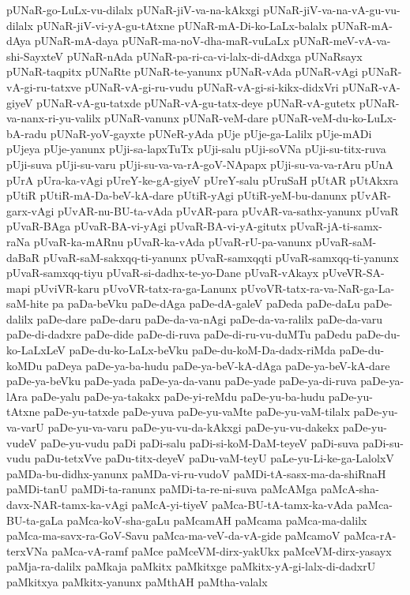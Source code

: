 {pUNaR-go-LuLx-vu-dilalx
pUNaR-jiV-va-na-kAkxgi
pUNaR-jiV-va-na-vA-gu-vu-dilalx
pUNaR-jiV-vi-yA-gu-tAtxne
pUNaR-mA-Di-ko-LaLx-balalx
pUNaR-mA-dAya
pUNaR-mA-daya
pUNaR-ma-noV-dha-maR-vuLaLx
pUNaR-meV-vA-va-shi-SayxteV
pUNaR-nAda
pUNaR-pa-ri-ca-vi-lalx-di-dAdxga
pUNaRsayx
pUNaR-taqpitx
pUNaRte
pUNaR-te-yanunx
pUNaR-vAda
pUNaR-vAgi
pUNaR-vA-gi-ru-tatxve
pUNaR-vA-gi-ru-vudu
pUNaR-vA-gi-si-kikx-didxVri
pUNaR-vA-giyeV
pUNaR-vA-gu-tatxde
pUNaR-vA-gu-tatx-deye
pUNaR-vA-gutetx
pUNaR-va-nanx-ri-yu-valilx
pUNaR-vanunx
pUNaR-veM-dare
pUNaR-veM-du-ko-LuLx-bA-radu
pUNaR-yoV-gayxte
pUNeR-yAda
pUje
pUje-ga-Lalilx
pUje-mADi
pUjeya
pUje-yanunx
pUji-sa-lapxTuTx
pUji-salu
pUji-soVNa
pUji-su-titx-ruva
pUji-suva
pUji-su-varu
pUji-su-va-va-rA-goV-NApapx
pUji-su-va-va-rAru
pUnA
pUrA
pUra-ka-vAgi
pUreY-ke-gA-giyeV
pUreY-salu
pUruSaH
pUtAR
pUtAkxra
pUtiR
pUtiR-mA-Da-beV-kA-dare
pUtiR-yAgi
pUtiR-yeM-bu-danunx
pUvAR-garx-vAgi
pUvAR-nu-BU-ta-vAda
pUvAR-para
pUvAR-va-sathx-yanunx
pUvaR
pUvaR-BAga
pUvaR-BA-vi-yAgi
pUvaR-BA-vi-yA-gitutx
pUvaR-jA-ti-samx-raNa
pUvaR-ka-mARnu
pUvaR-ka-vAda
pUvaR-rU-pa-vanunx
pUvaR-saM-daBaR
pUvaR-saM-sakxqq-ti-yanunx
pUvaR-samxqqti
pUvaR-samxqq-ti-yanunx
pUvaR-samxqq-tiyu
pUvaR-si-dadhx-te-yo-Dane
pUvaR-vAkayx
pUveVR-SA-mapi
pUviVR-karu
pUvoVR-tatx-ra-ga-Lanunx
pUvoVR-tatx-ra-va-NaR-ga-La-saM-hite
pa
paDa-beVku
paDe-dAga
paDe-dA-galeV
paDeda
paDe-daLu
paDe-dalilx
paDe-dare
paDe-daru
paDe-da-va-nAgi
paDe-da-va-ralilx
paDe-da-varu
paDe-di-dadxre
paDe-dide
paDe-di-ruva
paDe-di-ru-vu-duMTu
paDedu
paDe-du-ko-LaLxLeV
paDe-du-ko-LaLx-beVku
paDe-du-koM-Da-dadx-riMda
paDe-du-koMDu
paDeya
paDe-ya-ba-hudu
paDe-ya-beV-kA-dAga
paDe-ya-beV-kA-dare
paDe-ya-beVku
paDe-yada
paDe-ya-da-vanu
paDe-yade
paDe-ya-di-ruva
paDe-ya-lAra
paDe-yalu
paDe-ya-takakx
paDe-yi-reMdu
paDe-yu-ba-hudu
paDe-yu-tAtxne
paDe-yu-tatxde
paDe-yuva
paDe-yu-vaMte
paDe-yu-vaM-tilalx
paDe-yu-va-varU
paDe-yu-va-varu
paDe-yu-vu-da-kAkxgi
paDe-yu-vu-dakekx
paDe-yu-vudeV
paDe-yu-vudu
paDi
paDi-salu
paDi-si-koM-DaM-teyeV
paDi-suva
paDi-su-vudu
paDu-tetxVve
paDu-titx-deyeV
paDu-vaM-teyU
paLe-yu-Li-ke-ga-LalolxV
paMDa-bu-didhx-yanunx
paMDa-vi-ru-vudoV
paMDi-tA-sasx-ma-da-shiRnaH
paMDi-tanU
paMDi-ta-ranunx
paMDi-ta-re-ni-suva
paMcAMga
paMcA-sha-davx-NAR-tamx-ka-vAgi
paMcA-yi-tiyeV
paMca-BU-tA-tamx-ka-vAda
paMca-BU-ta-gaLa
paMca-koV-sha-gaLu
paMcamAH
paMcama
paMca-ma-dalilx
paMca-ma-savx-ra-GoV-Savu
paMca-ma-veV-da-vA-gide
paMcamoV
paMca-rA-terxVNa
paMca-vA-ramf
paMce
paMceVM-dirx-yakUkx
paMceVM-dirx-yasayx
paMja-ra-dalilx
paMkaja
paMkitx
paMkitxge
paMkitx-yA-gi-lalx-di-dadxrU
paMkitxya
paMkitx-yanunx
paMthAH
paMtha-valalx
}
